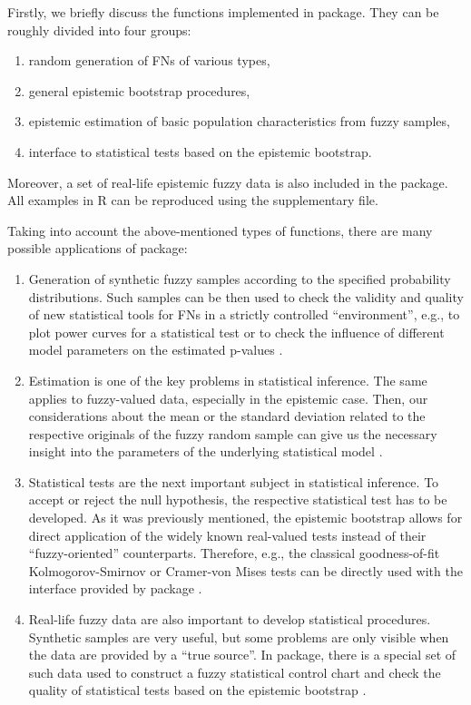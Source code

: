 Firstly, we briefly discuss the functions implemented in  package.
They can be roughly divided into four groups:
\begin{enumerate}
\item random generation of FNs of various types,
\item general epistemic bootstrap procedures,
\item epistemic estimation of basic population characteristics from fuzzy samples,
\item interface to statistical tests based on the epistemic bootstrap.
\end{enumerate}
Moreover, a set of real-life epistemic fuzzy data is also included in the package.
All examples in R can be reproduced using the supplementary file.

Taking into account the above-mentioned types of functions, there are many possible applications of  package:
\begin{enumerate}
	\item Generation of synthetic fuzzy samples according to the specified probability distributions.
	Such samples can be then used to check the validity and quality of new statistical tools for FNs in a strictly controlled ``environment'', e.g., to plot power curves for a statistical test \citep{pgmr2022} or to check the  influence of different model parameters on the estimated p-values \citep{PGMR2024AMS}.
	\item Estimation is one of the key problems in statistical inference.
	The same applies to fuzzy-valued data, especially in the epistemic case.
	Then, our considerations about the mean or the standard deviation related to the respective originals of the fuzzy random sample can give us the necessary insight into the parameters of the underlying statistical model \citep{grzegorzewski2021,pgmr2022}.
	\item Statistical tests are the next important subject in statistical inference.
	To accept or reject the null hypothesis, the respective statistical test has to be developed.
	As it was previously mentioned, the epistemic bootstrap allows for direct application of the widely known real-valued tests instead of their ``fuzzy-oriented'' counterparts.
	Therefore, e.g., the classical goodness-of-fit Kolmogorov-Smirnov or Cramer-von Mises tests  can be directly used with the interface provided by  package \citep{10.1007/978-3-031-08974-9_39,PGMR2024AMS}.
	\item Real-life fuzzy data are also important to develop statistical procedures.
	Synthetic samples are very useful, but some problems are only visible when the data are provided by a ``true source''.
	In  package, there is a special set of such data used to construct a fuzzy statistical control chart \citep{FARAZ20102684} and check the quality of statistical tests based on the epistemic bootstrap \citep{PGMR2024AMS}.
\end{enumerate}

